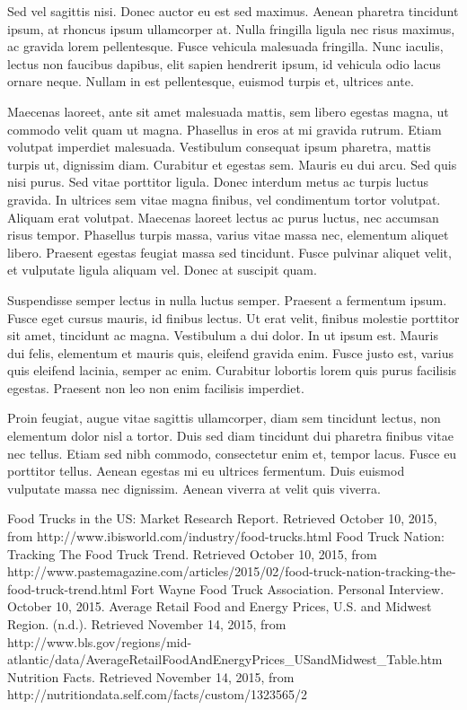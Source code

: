 \documentclass[12pt, letterpaper]{article}
\begin{document}
Sed vel sagittis nisi. Donec auctor eu est sed maximus. Aenean pharetra tincidunt ipsum, at rhoncus ipsum ullamcorper at. Nulla fringilla ligula nec risus maximus, ac gravida lorem pellentesque. Fusce vehicula malesuada fringilla. Nunc iaculis, lectus non faucibus dapibus, elit sapien hendrerit ipsum, id vehicula odio lacus ornare neque. Nullam in est pellentesque, euismod turpis et, ultrices ante.

Maecenas laoreet, ante sit amet malesuada mattis, sem libero egestas magna, ut commodo velit quam ut magna. Phasellus in eros at mi gravida rutrum. Etiam volutpat imperdiet malesuada. Vestibulum consequat ipsum pharetra, mattis turpis ut, dignissim diam. Curabitur et egestas sem. Mauris eu dui arcu. Sed quis nisi purus. Sed vitae porttitor ligula. Donec interdum metus ac turpis luctus gravida. In ultrices sem vitae magna finibus, vel condimentum tortor volutpat. Aliquam erat volutpat. Maecenas laoreet lectus ac purus luctus, nec accumsan risus tempor. Phasellus turpis massa, varius vitae massa nec, elementum aliquet libero. Praesent egestas feugiat massa sed tincidunt. Fusce pulvinar aliquet velit, et vulputate ligula aliquam vel. Donec at suscipit quam.

Suspendisse semper lectus in nulla luctus semper. Praesent a fermentum ipsum. Fusce eget cursus mauris, id finibus lectus. Ut erat velit, finibus molestie porttitor sit amet, tincidunt ac magna. Vestibulum a dui dolor. In ut ipsum est. Mauris dui felis, elementum et mauris quis, eleifend gravida enim. Fusce justo est, varius quis eleifend lacinia, semper ac enim. Curabitur lobortis lorem quis purus facilisis egestas. Praesent non leo non enim facilisis imperdiet.

Proin feugiat, augue vitae sagittis ullamcorper, diam sem tincidunt lectus, non elementum dolor nisl a tortor. Duis sed diam tincidunt dui pharetra finibus vitae nec tellus. Etiam sed nibh commodo, consectetur enim et, tempor lacus. Fusce eu porttitor tellus. Aenean egestas mi eu ultrices fermentum. Duis euismod vulputate massa nec dignissim. Aenean viverra at velit quis viverra.

\newpage

\begin{thebibliography}{9}

        Food Trucks in the US: Market Research Report. Retrieved October 10, 2015, from http://www.ibisworld.com/industry/food-trucks.html
        Food Truck Nation: Tracking The Food Truck Trend. Retrieved October 10, 2015, from http://www.pastemagazine.com/articles/2015/02/food-truck-nation-tracking-the-food-truck-trend.html        
         Fort Wayne Food Truck Association. Personal Interview. October 10, 2015.
        Average Retail Food and Energy Prices, U.S. and Midwest Region. (n.d.). Retrieved November 14, 2015, from http://www.bls.gov/regions/mid-atlantic/data/AverageRetailFoodAndEnergyPrices\_USandMidwest\_Table.htm
	    Nutrition Facts. Retrieved November 14, 2015, from http://nutritiondata.self.com/facts/custom/1323565/2

\end{thebibliography}

\newpage

\end{document}
